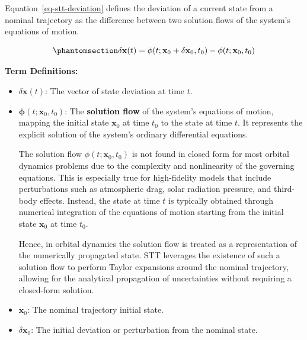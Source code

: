 \documentclass[
  letterpaper,
  DIV=11,
  numbers=noendperiod,
  oneside]{scrartcl}
\begin{document}
Equation~\ref{eq-stt-deviation} defines the deviation of a current state
from a nominal trajectory as the difference between two solution flows
of the system's equations of motion.

\begin{equation}\protect\phantomsection\label{eq-stt-deviation}{
\delta \mathbf{x}(t) = \mathbf{\phi}(t; \mathbf{x}_0 + \delta \mathbf{x}_0, t_0) - \mathbf{\phi}(t; \mathbf{x}_0, t_0)
}\end{equation}

\textbf{Term Definitions:}

\begin{itemize}
\item
  \(\delta \mathbf{x}(t)\): The vector of state deviation at time \(t\).
\item
  \(\mathbf{\phi}(t; \mathbf{x}_0, t_0)\): The \textbf{solution flow} of
  the system's equations of motion, mapping the initial state
  \(\mathbf{x}_0\) at time \(t_0\) to the state at time \(t\). It
  represents the explicit solution of the system's ordinary differential
  equations.

  \begin{tcolorbox}[enhanced jigsaw, arc=.35mm, bottomrule=.15mm, bottomtitle=1mm, breakable, colback=white, colbacktitle=quarto-callout-important-color!10!white, colframe=quarto-callout-important-color-frame, coltitle=black, left=2mm, leftrule=.75mm, opacityback=0, opacitybacktitle=0.6, rightrule=.15mm, title=\textcolor{quarto-callout-important-color}{\faExclamation}\hspace{0.5em}{Solution Flow in Orbital dynamics}, titlerule=0mm, toprule=.15mm, toptitle=1mm]

  The solution flow \(\phi(t; \mathbf{x}_0, t_0)\) is not found in
  closed form for most orbital dynamics problems due to the complexity
  and nonlinearity of the governing equations. This is especially true
  for high-fidelity models that include perturbations such as
  atmospheric drag, solar radiation pressure, and third-body effects.
  Instead, the state at time \(t\) is typically obtained through
  numerical integration of the equations of motion starting from the
  initial state \(\mathbf{x}_0\) at time \(t_0\).

  Hence, in orbital dynamics the solution flow is treated as a
  representation of the numerically propagated state. STT leverages the
  existence of such a solution flow to perform Taylor expansions around
  the nominal trajectory, allowing for the analytical propagation of
  uncertainties without requiring a closed-form solution.

  \end{tcolorbox}
\item
  \(\mathbf{x}_0\): The nominal trajectory initial state.
\item
  \(\delta \mathbf{x}_0\): The initial deviation or perturbation from
  the nominal state.
\end{itemize}
\end{document}
